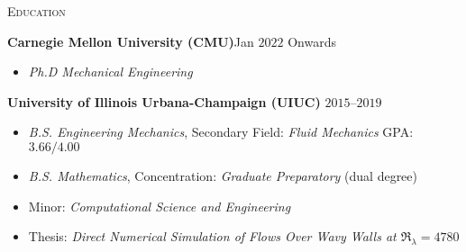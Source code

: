 \documentclass[10pt]{article}
\begin{document}
\begin{multicols}{2}
\textsc{Education}
\columnbreak

\textbf{Carnegie Mellon University (CMU)}\hfill Jan $2022$ Onwards

\vspace{-1.75em}
\begin{itemize}[label= ,leftmargin=1.0em]
    \setlength\itemsep{-0.25em}
    \item \textit{Ph.D Mechanical Engineering}
\end{itemize}
\vspace{-2.0em}

\vspace{0.5em}

\textbf{University of Illinois Urbana-Champaign (UIUC)} \hfill $2015$--$2019$

\vspace{-1.75em}
\begin{itemize}[label= ,leftmargin=1.0em]
    \setlength\itemsep{-0.25em}
    \item \textit{B.S. Engineering Mechanics}, Secondary Field: \textit{Fluid Mechanics} \hfill GPA: $3.66/4.00$
    \item \textit{B.S. Mathematics}, Concentration: \textit{Graduate Preparatory} \hfill (dual degree)
    \item Minor: \textit{Computational Science and Engineering}
    \item Thesis: \textit{Direct Numerical Simulation of Flows Over Wavy Walls at $\Re_\lambda=4780$}
\end{itemize}
\vspace{-2.0em}

\end{multicols}
\vspace{-1.5em}
\end{document}

